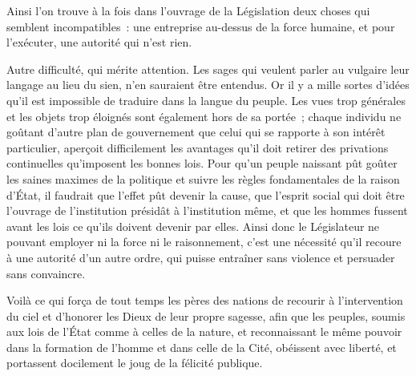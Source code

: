 \documentclass[french,twoside]{book} %
\begin{document}
Ainsi l’on trouve à la fois dans l’ouvrage de la Législation deux choses qui semblent incompatibles : une entreprise au-dessus de la force humaine, et pour l’exécuter, une autorité qui n’est rien.\par
Autre difficulté, qui mérite attention. Les sages qui veulent parler au vulgaire leur langage au lieu du sien, n’en sauraient être entendus. Or il y a mille sortes d’idées qu’il est impossible de traduire dans la langue du peuple. Les vues trop générales et les objets trop éloignés sont également hors de sa portée ; chaque individu ne goûtant d’autre plan de gouvernement que celui qui se rapporte à son intérêt particulier, aperçoit difficilement les avantages qu’il doit retirer des privations continuelles qu’imposent les bonnes lois. Pour qu’un peuple naissant pût goûter les saines maximes de la politique et suivre les règles fondamentales de la raison d’État, il faudrait que l’effet pût devenir la cause, que l’esprit social qui doit être l’ouvrage de l’institution présidât à l’institution même, et que les hommes fussent avant les lois ce qu’ils doivent devenir par elles. Ainsi donc le Législateur ne pouvant employer ni la force ni le raisonnement, c’est une nécessité qu’il recoure à une autorité d’un autre ordre, qui puisse entraîner sans violence et persuader sans convaincre.\par
Voilà ce qui força de tout temps les pères des nations de recourir à l’intervention du ciel et d’honorer les Dieux de leur propre sagesse, afin que les peuples, soumis aux lois de l’État comme à celles de la nature, et reconnaissant le même pouvoir dans la formation de l’homme et dans celle de la Cité, obéissent avec liberté, et portassent docilement le joug de la félicité publique.\par
\end{document}

